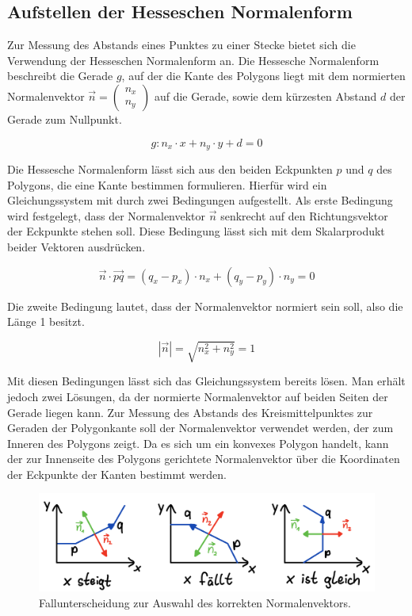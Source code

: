 \documentclass[12pt]{scrartcl}
\begin{document}
\subsection{Aufstellen der Hesseschen Normalenform}
Zur Messung des Abstands eines Punktes zu einer Stecke bietet sich die Verwendung der Hesseschen Normalenform an.
Die Hessesche Normalenform beschreibt die Gerade $g$, auf der die Kante des Polygons liegt mit dem normierten Normalenvektor $\vec{n} =  \begin{pmatrix} n_x \\ n_y \end{pmatrix}$ auf die Gerade, sowie dem kürzesten Abstand $d$ der Gerade zum Nullpunkt.

\begin{equation}
    g: n_x \cdot x + n_y \cdot y + d = 0
\end{equation}

Die Hessesche Normalenform lässt sich aus den beiden Eckpunkten $p$ und $q$ des Polygons, die eine Kante bestimmen formulieren.
Hierfür wird ein Gleichungssystem mit durch zwei Bedingungen aufgestellt.
Als erste Bedingung wird festgelegt, dass der Normalenvektor $\vec{n}$ senkrecht auf den Richtungsvektor der Eckpunkte stehen soll. Diese Bedingung lässt sich mit dem Skalarprodukt beider Vektoren ausdrücken.

\begin{equation}
    \vec{n} \cdot \vec{pq} = (q_x - p_x) \cdot n_x + (q_y - p_y) \cdot n_y = 0
\end{equation}

Die zweite Bedingung lautet, dass der Normalenvektor normiert sein soll, also die Länge 1 besitzt.

\begin{equation}
    |\vec{n}| = \sqrt{n_x^2 + n_y^2} = 1
\end{equation}

Mit diesen Bedingungen lässt sich das Gleichungssystem bereits lösen.
Man erhält jedoch zwei Lösungen, da der normierte Normalenvektor auf beiden Seiten der Gerade liegen kann.
Zur Messung des Abstands des Kreismittelpunktes zur Geraden der Polygonkante soll der Normalenvektor verwendet werden, der zum Inneren des Polygons zeigt.
Da es sich um ein konvexes Polygon handelt, kann der zur Innenseite des Polygons gerichtete Normalenvektor über die Koordinaten der Eckpunkte der Kanten bestimmt werden.

\begin{figure}[ht]
    \centering
    \includegraphics[scale=0.2]{Auswahl Normalenvektor.png}
    \caption{Fallunterscheidung zur Auswahl des korrekten Normalenvektors.}
    \label{fig:auswahlNormvek}
\end{figure}
\end{document}
